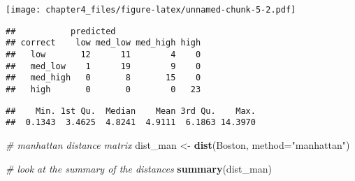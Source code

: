 \documentclass[
]{article}
\newenvironment{Shaded}{\begin{snugshade}}{\end{snugshade}}
\newcommand{\CommentTok}[1]{\textcolor[rgb]{0.56,0.35,0.01}{\textit{#1}}}
\newcommand{\DataTypeTok}[1]{\textcolor[rgb]{0.13,0.29,0.53}{#1}}
\newcommand{\KeywordTok}[1]{\textcolor[rgb]{0.13,0.29,0.53}{\textbf{#1}}}
\newcommand{\NormalTok}[1]{#1}
\newcommand{\OperatorTok}[1]{\textcolor[rgb]{0.81,0.36,0.00}{\textbf{#1}}}
\newcommand{\StringTok}[1]{\textcolor[rgb]{0.31,0.60,0.02}{#1}}
\begin{document}
\texttt{[image: chapter4\_files/figure-latex/unnamed-chunk-5-2.pdf]}

\begin{Shaded}
\end{Shaded}

\begin{verbatim}
##           predicted
## correct    low med_low med_high high
##   low       12      11        4    0
##   med_low    1      19        9    0
##   med_high   0       8       15    0
##   high       0       0        0   23
\end{verbatim}

\begin{Shaded}
\end{Shaded}

\begin{verbatim}
##    Min. 1st Qu.  Median    Mean 3rd Qu.    Max. 
##  0.1343  3.4625  4.8241  4.9111  6.1863 14.3970
\end{verbatim}

\begin{Shaded}
\begin{Highlighting}[]
\CommentTok{# manhattan distance matrix}
\NormalTok{dist_man <-}\StringTok{ }\KeywordTok{dist}\NormalTok{(Boston, }\DataTypeTok{method=}\StringTok{"manhattan"}\NormalTok{)}


\CommentTok{# look at the summary of the distances}
\KeywordTok{summary}\NormalTok{(dist_man)}
\end{Highlighting}
\end{Shaded}
\end{document}
